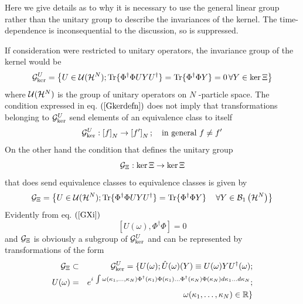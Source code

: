 \noindent Here we give details as to why it is necessary to use the general
linear group rather than the unitary group to describe the invariances of
the kernel. The time-dependence is inconsequential to the discussion, so is
suppressed.

If consideration were restricted to unitary operators, the invariance group
of the kernel would be 
\begin{equation}
{\cal G}_{\ker }^{U}=\left\{ U\in {\cal U}({\cal H}^{N});{\rm Tr}\{\Phi
^{\dagger }\Phi UYU^{\dagger }\}={\rm Tr}\{\Phi ^{\dagger }\Phi
Y\}=0\,\forall Y\in \ker \Xi \right\}  \label{Gkerdefn}
\end{equation}%
where ${\cal U}({\cal H}^{N})$ is the group of unitary operators on $N$%
-particle space. The condition expressed in eq. $\left( \ref{Gkerdefn}%
\right) $ does not imply that transformations belonging to ${\cal G}_{\ker
}^{U}$ send elements of an equivalence class to itself 
\begin{equation}
{\cal G}_{\ker }^{U}:\left[ f\right] _{N}\rightarrow \left[ f^{\prime }%
\right] _{N};\quad \text{in general }f\neq f^{\prime }
\end{equation}%
On the other hand the condition that defines the unitary group 
\begin{equation}
{\cal G}_{\Xi }:\ker \Xi \rightarrow \ker \Xi
\end{equation}%
that does send equivalence classes to equivalence classes is given by 
\begin{equation}
{\cal G}_{\Xi }=\left\{ U\in {\cal U}({\cal H}^{N});{\rm Tr}\{\Phi ^{\dagger
}\Phi UYU^{\dagger }\}={\rm Tr}\{\Phi ^{\dagger }\Phi Y\}\quad \,\forall
Y\in {\cal B}_{1}\left( {\cal H}^{N}\right) \right\}  \label{GXi}
\end{equation}%
Evidently from eq. $\left( \ref{GXi}\right) $ 
\begin{equation}
\left[ U(\omega ),\Phi ^{\dagger }\Phi \right] =0
\end{equation}%
and ${\cal G}_{\Xi }$ is obviously a subgroup of ${\cal G}_{\ker }^{U}$ and
can be represented by transformations of the form 
\begin{eqnarray}
{\cal G}_{\Xi } &\subset &{\cal G}_{\ker }^{U}=\{U(\omega );\hat{U}(\omega
)(Y)\equiv U(\omega )YU^{\dagger }(\omega );  \nonumber \\
U(\omega ) &=&e^{i\,\int \omega (\kappa _{1},\ldots ,\kappa _{N})\Phi
^{\dagger }(\kappa _{1})\Phi (\kappa _{1})\ldots \Phi ^{\dagger }(\kappa
_{N})\Phi (\kappa _{N})d\kappa _{1}\ldots d\kappa _{N}};  \nonumber \\
&&\qquad \qquad \qquad \qquad \quad \omega (\kappa _{1},\ldots ,\kappa
_{N})\in {\Bbb R}\}  \label{GXidefn}
\end{eqnarray}%
